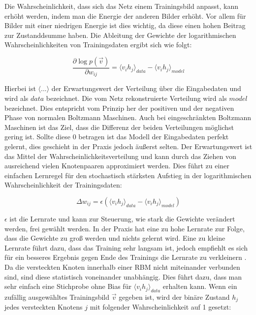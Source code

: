 \documentclass[12pt]{article}
\begin{document}
Die Wahrscheinlichkeit, dass sich das Netz einem Trainingsbild anpasst, kann erhöht werden, indem man die Energie der anderen Bilder erhöht. Vor allem für Bilder mit einer niedrigen Energie ist dies wichtig, da diese einen hohen Beitrag zur Zustanddsumme haben. Die Ableitung der Gewichte der logarithmischen Wahrscheinlichkeiten von Trainingsdaten ergibt sich wie folgt:

\begin{equation}
\frac{\partial \log p(\vec{v})}{\partial w_{ij}} = \langle v_ih_j \rangle_{data} - \langle v_i h_j \rangle_{model}
\end{equation}

Hierbei ist $\langle...\rangle$ der Erwartungswert der Verteilung über die Eingabedaten und wird als $data$ bezeichnet. Die vom Netz rekonstruierte Verteilung wird als $model$ bezeichnet. Dies entspricht vom Prinzip her der positiven und der negativen Phase von normalen Boltzmann Maschinen. Auch bei eingeschränkten Boltzmann Maschinen ist das Ziel, dass die Differenz der beiden Verteilungen möglichst gering ist. Sollte diese 0 betragen ist das Modell der Eingabedaten perfekt gelernt, dies geschieht in der Praxis jedoch äußerst selten. Der Erwartungswert ist das Mittel der Wahrscheinlichkeitsverteilung und kann durch das Ziehen von ausreichend vielen Knotenpaaren approximiert werden. Dies führt zu einer einfachen Lernregel für den stochastisch stärksten Aufstieg in der logarithmischen Wahrscheinlichkeit der Trainingsdaten:

\begin{equation}
\Delta w_{ij} = \epsilon\left( \langle v_i h_j \rangle_{data} - \langle v_i h_j \rangle_{model} \right)
\end{equation}

$\epsilon$ ist die Lernrate und kann zur Steuerung, wie stark die Gewichte verändert werden, frei gewählt werden. In der Praxis hat eine zu hohe Lernrate zur Folge, dass die Gewichte zu groß werden und nichts gelernt wird. Eine zu kleine Lernrate führt dazu, dass das Training sehr langsam ist, jedoch empfiehlt es sich für ein besseres Ergebnis gegen Ende des Trainings die Lernrate zu verkleinern \cite{guide}. Da die versteckten Knoten innerhalb einer RBM nicht miteinander verbunden sind, sind diese statistisch voneinander unabhängig. Dies führt dazu, dass man sehr einfach eine Stichprobe ohne Bias für $\langle v_i h_j \rangle_{data}$ erhalten kann. Wenn ein zufällig ausgewähltes Trainingsbild $\vec{v}$ gegeben ist, wird der binäre Zustand $h_j$ jedes versteckten Knotens $j$ mit folgender Wahrscheinlichkeit auf 1 gesetzt:
\end{document}
